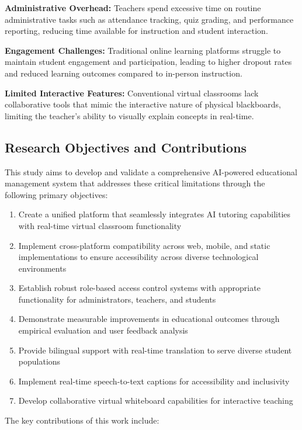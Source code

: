 \documentclass[onecolumn]{IEEEtran}
\begin{document}
\textbf{Administrative Overhead:} Teachers spend excessive time on routine administrative tasks such as attendance tracking, quiz grading, and performance reporting, reducing time available for instruction and student interaction.

\textbf{Engagement Challenges:} Traditional online learning platforms struggle to maintain student engagement and participation, leading to higher dropout rates and reduced learning outcomes compared to in-person instruction.

\textbf{Limited Interactive Features:} Conventional virtual classrooms lack collaborative tools that mimic the interactive nature of physical blackboards, limiting the teacher's ability to visually explain concepts in real-time.

\subsection{Research Objectives and Contributions}

This study aims to develop and validate a comprehensive AI-powered educational management system that addresses these critical limitations through the following primary objectives:

\begin{enumerate}
\item Create a unified platform that seamlessly integrates AI tutoring capabilities with real-time virtual classroom functionality
\item Implement cross-platform compatibility across web, mobile, and static implementations to ensure accessibility across diverse technological environments
\item Establish robust role-based access control systems with appropriate functionality for administrators, teachers, and students
\item Demonstrate measurable improvements in educational outcomes through empirical evaluation and user feedback analysis
\item Provide bilingual support with real-time translation to serve diverse student populations
\item Implement real-time speech-to-text captions for accessibility and inclusivity
\item Develop collaborative virtual whiteboard capabilities for interactive teaching
\end{enumerate}

The key contributions of this work include:
\end{document}
